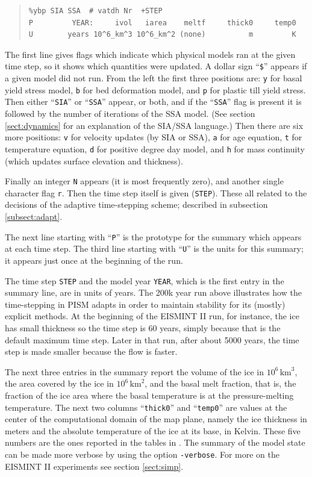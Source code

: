 \documentclass[11pt,final]{amsart}
\renewcommand{\t}[1]{\texttt{#1}}
\begin{document}
\small\begin{quote}\begin{verbatim}
%ybp SIA SSA  # vatdh Nr  +STEP
P         YEAR:     ivol   iarea    meltf     thick0     temp0
U        years 10^6_km^3 10^6_km^2 (none)          m         K
\end{verbatim}
\end{quote}\normalsize

\noindent The first line gives flags which indicate which physical models ran at the given time step, so it shows which quantities were updated.  A dollar sign ``\t{\$}'' appears if a given model did not run.  From the left the first three positions are: \t{y} for basal yield stress model, \t{b} for bed deformation model, and \t{p} for plastic till yield stress.  Then either ``\verb|SIA|'' or ``\verb|SSA|'' appear, or both, and if the ``\verb|SSA|'' flag is present it is followed by the number of iterations of the SSA model.  (See section \ref{sect:dynamics} for an explanation of the SIA/SSA language.)  Then there are six more positions: \t{v} for velocity updates (by SIA or SSA), \t{a} for age equation, \t{t} for temperature equation, \t{d} for positive degree day model, and \t{h} for mass continuity (which updates surface elevation and thickness).  

Finally an integer \t{N} appears (it is most frequently zero), and another single character flag \t{r}.  Then the time step itself is given (\t{STEP}).  These all related to the decisions of the adaptive time-stepping scheme; described in subsection \ref{subsect:adapt}.

The next line starting with ``\t{P}'' is the prototype for the summary which appears at each time step.  The third line starting with ``\t{U}'' is the units for this summary; it appears just once at the beginning of the run.

The time step \t{STEP} and the model year \t{YEAR}, which is the first entry in the summary line, are in units of years.  The 200k year run above illustrates how the time-stepping in PISM adapts in order to maintain stability for its (mostly) explicit methods.  At the beginning of the EISMINT II run, for instance, the ice has small thickness so the time step is 60 years, simply because that is the default maximum time step.  Later in that run, after about 5000 years, the time step is made smaller because the flow is faster.

The next three entries in the summary report the volume of the ice in $10^6 \,\text{km}^3$, the area covered by the ice in $10^6\,\text{km}^2$, and the basal melt fraction, that is, the fraction of the ice area where the basal temperature is at the pressure-melting temperature.  The next two columns ``\texttt{thick0}'' and ``\texttt{temp0}'' are values at the center of the computational domain of the map plane, namely the ice thickness in meters and the absolute temperature of the ice at its base, in Kelvin.  These five numbers are the ones reported in the tables in \cite{EISMINT00}.  The summary of the model state can be made more verbose by using the option \verb|-verbose|.  For more on the EISMINT II experiments see section \ref{sect:simp}.
\end{document}
